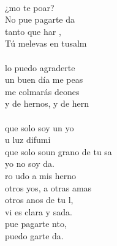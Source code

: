 \begin{cancion}%
	    \\
	¿mo te poar?  \\
	No pue pagarte da   \\
	 tanto que har , \\
	Tú melevas en tusalm  \\
\jump\\
	lo puedo agraderte\\
	un buen día me peas\\
	me colmarás deones\\
	y de hernos, y de hern  \\
\jump\\
	 que solo soy un yo  \\
	u luz difumi\\
	 que solo soun grano de tu sa \\
	yo no soy da.\\
	ro udo a mis herno\\
	otros yos, a otras amas\\
	otros anos de tu l,\\
	 vi es clara y sada. \\
	 pue pagarte nto,\\
	 puedo garte da.\\
\end{cancion}%
